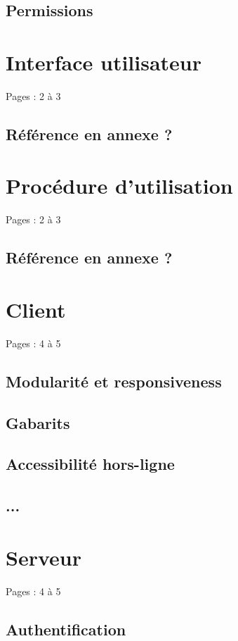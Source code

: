 \documentclass{eplmastersthesis_FR}
\begin{document}
			\subsection*{Permissions}

		\section{Interface utilisateur}

			Pages : 2 à 3

			\subsection*{Référence en annexe ?}

		\section{Procédure d'utilisation}

			Pages : 2 à 3

			\subsection*{Référence en annexe ?}

		\section{Client}

			Pages : 4 à 5
			\subsection*{Modularité et responsiveness}
			\subsection*{Gabarits}
			\subsection*{Accessibilité hors-ligne}
			\subsection*{...}

		\section{Serveur}

			Pages : 4 à 5
			\subsection*{Authentification}
\end{document}
